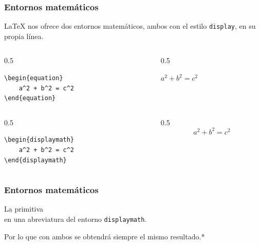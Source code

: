 \documentclass[12pt,aspectratio=169,ignorenonframetext]{ltxbeamer}
\begin{document}
\begin{frame}[fragile]
\frametitle{Entornos matemáticos}

{\lmr\LaTeX} nos ofrece dos entornos matemáticos, ambos con el estilo \texttt{display}, en su propia línea.

\pause\medskip

\begin{columns}
    \begin{column}{0.5\textwidth}
        \begin{verbatim}
\begin{equation}
    a^2 + b^2 = c^2
\end{equation}
        \end{verbatim}
    \end{column}
    {\color{gray} \vline}
    \begin{column}{0.5\textwidth}
        \lmr\strut\hfill\(\displaystyle a^2 + b^2 = c^2\)\hfill{}
    \end{column}
\end{columns}

\pause\medskip

\begin{columns}
    \begin{column}{0.5\textwidth}
        \begin{verbatim}
\begin{displaymath}
    a^2 + b^2 = c^2
\end{displaymath}
        \end{verbatim}
    \end{column}
    {\color{gray} \vline}
    \begin{column}{0.5\textwidth}
        \begin{displaymath}
            a^2 + b^2 = c^2
        \end{displaymath}
    \end{column}
\end{columns}
\end{frame}





\begin{frame}[fragile]
\frametitle{Entornos matemáticos}

La primitiva \texttt{\[\]} en una abreviatura del entorno \texttt{displaymath}.

Por lo que con ambos se obtendrá siempre el mismo resultado.\pause\alert{*}
\end{frame}
\end{document}
